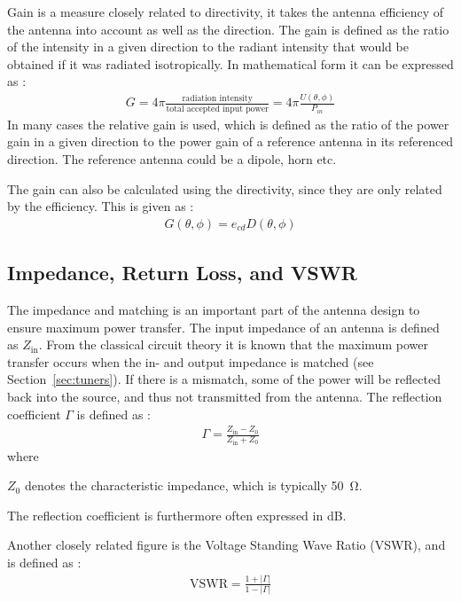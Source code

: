 Gain is a measure closely related to directivity, it takes the antenna efficiency of the antenna into account as well as the direction. The gain is defined as the ratio of the intensity in a given direction to the radiant intensity that would be obtained if it was radiated isotropically. In mathematical form it can be expressed as \cite{balanis2012antenna}:
\begin{align}
  G = 4 \pi \frac{\text{radiation intensity}}{\text{total accepted input power}} = 4 \pi \frac{U(\theta,\phi)}{P_{in}}
\end{align}
In many cases the relative gain is used, which is defined as the ratio of the power gain in a given direction to the power gain of a reference antenna in its referenced direction. The reference antenna could be a dipole, horn etc. 

The gain can also be calculated using the directivity, since they are only related by the efficiency. This is given as \cite{balanis2012antenna}:
\begin{align}
  G(\theta,\phi) = e_{cd}D(\theta, \phi) 
\end{align}

\subsection{Impedance, Return Loss, and VSWR}
The impedance and matching is an important part of the antenna design to ensure maximum power transfer. The input impedance of an antenna is defined as $Z_{\text{in}}$. From the classical circuit theory it is known that the maximum power transfer occurs when the in- and output impedance is matched (see Section~\ref{sec:tuners}). If there is a mismatch, some of the power will be reflected back into the source, and thus not transmitted from the antenna. The reflection coefficient $\Gamma$ is defined as \cite{pozar2011microwave}:
\begin{align}
    \Gamma = \frac{Z_{\text{in}}-Z_0}{Z_{\text{in}}+Z_0} 
\end{align}
where
\begin{where}
\item[$Z_0$] denotes the characteristic impedance, which is typically \SI{50}{\ohm}.
\end{where}
The reflection coefficient is furthermore often expressed in \si{dB}. 

Another closely related figure is the Voltage Standing Wave Ratio (VSWR), and is defined as \cite{pozar2011microwave}: 
\begin{align}
  \text{VSWR} = \frac{1+|\Gamma|}{1-|\Gamma|}
\end{align}

